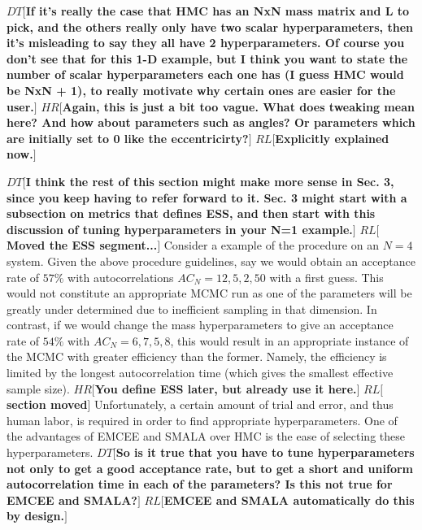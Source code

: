 \documentclass{aa}
\def\memohr#1{\color{blue}$HR[${\bf #1}$]$ \color{black}}
\def\memodt#1{\color{green}$DT[${\bf #1}$]$ \color{black}}
\def\memorl#1{\color{gray}$RL[${\bf #1}$]$ \color{black}}
\begin{document}
\memodt{If it's really the case that HMC has an NxN mass matrix and L to pick, and the others really only have two scalar hyperparameters, then it's misleading to say they all have 2 hyperparameters. Of course you don't see that for this 1-D example, but I think you want to state the number of scalar hyperparameters each one has (I guess HMC would be NxN + 1), to really motivate why certain ones are easier for the user.}
\memohr{Again, this is just a bit too vague. What does tweaking mean here? And how about parameters such as angles? Or parameters which are initially set to 0 like the eccentricirty?} \memorl{Explicitly explained now.}

\memodt{I think the rest of this section might make more sense in Sec. 3, since you keep having to refer forward to it. Sec. 3 might start with a subsection on metrics that defines ESS, and then start with this discussion of tuning hyperparameters in your N=1 example.} \memorl{Moved the ESS segment...}
Consider a example of the procedure on an $N=4$ system.
Given the above procedure guidelines, say we would obtain an acceptance rate of $57\%$ with autocorrelations $AC_N = 12, 5, 2, 50$ with a first guess.
This would not constitute an appropriate MCMC run as one of the parameters will be greatly under determined due to inefficient sampling in that dimension. 
In contrast, if we would change the mass hyperparameters to give an acceptance rate of $54\%$ with $AC_N = 6, 7, 5, 8$, this would result in an appropriate instance of the MCMC with greater efficiency than the former. 
Namely, the efficiency is limited by the longest autocorrelation time (which gives the smallest effective sample size). 
\memohr{You define ESS later, but already use it here.}
\memorl{section moved}
Unfortunately, a certain amount of trial and error, and thus human labor, is required in order to find appropriate hyperparameters. 
One of the advantages of EMCEE and SMALA over HMC is the ease of selecting these hyperparameters. \memodt{So is it true that you have to tune hyperparameters not only to get a good acceptance rate, but to get a short and uniform autocorrelation time in each of the parameters? Is this not true for EMCEE and SMALA?}
\memorl{EMCEE and SMALA automatically do this by design.}
\end{document}
